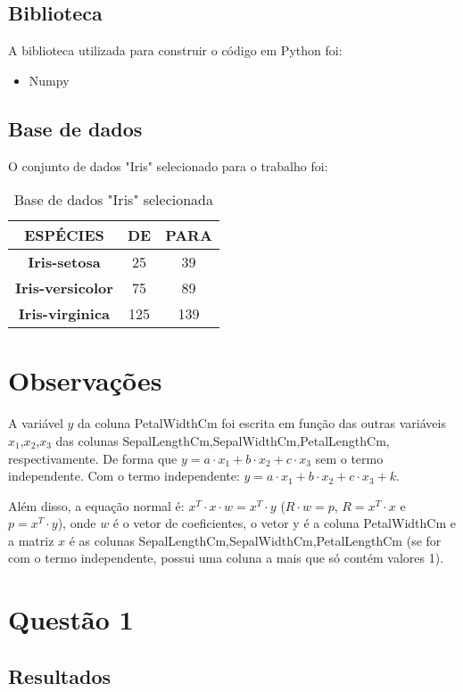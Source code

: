 \documentclass[a4paper,12pt,twoside]{article}
\begin{document}
\subsection{Biblioteca}
A biblioteca utilizada para construir o código em Python foi:
\begin{itemize}
   \item Numpy
 \end{itemize}
 \subsection{Base de dados}
 O  conjunto de dados "Iris" selecionado para o trabalho foi:
 \begin{table}[H]
\begin{tabular}{|c|c|c|} \hline
\textbf{ESPÉCIES} & DE & PARA \\\hline
\textbf{Iris-setosa}  & 25 & 39 \\\hline
\textbf{Iris-versicolor} & 75 & 89  \\\hline
\textbf{Iris-virginica} & 125 & 139 \\\hline

 
\end{tabular}
\label{tabela2}
\centering
\caption{Base de dados "Iris" selecionada}
\label {tabela2}
\end{table}

\section{Observações}
A variável $y$ da coluna PetalWidthCm foi escrita em função das outras variáveis $x_{1}$,$x_{2}$,$x_{3}$ das colunas SepalLengthCm,SepalWidthCm,PetalLengthCm, respectivamente. De forma que 
$y= a\cdot x_{1} +b\cdot x_{2}+c\cdot x_{3}$ sem o termo independente. Com o termo independente: $y= a\cdot x_{1} +b\cdot x_{2}+c\cdot x_{3} +k$.

    Além disso, a equação normal é: $x^{T}\cdot x\cdot w=x^{T}\cdot y$ ($R\cdot w=p$, $R=x^{T}\cdot x$ e $p = x^{T}\cdot y$), onde $w$ é o vetor de coeficientes, o vetor y é a coluna PetalWidthCm e a matriz $x$ é as colunas SepalLengthCm,SepalWidthCm,PetalLengthCm (se for com o termo independente, possui uma coluna a mais que só contém valores 1).


\section{Questão 1}
\subsection{Resultados}
\end{document}
